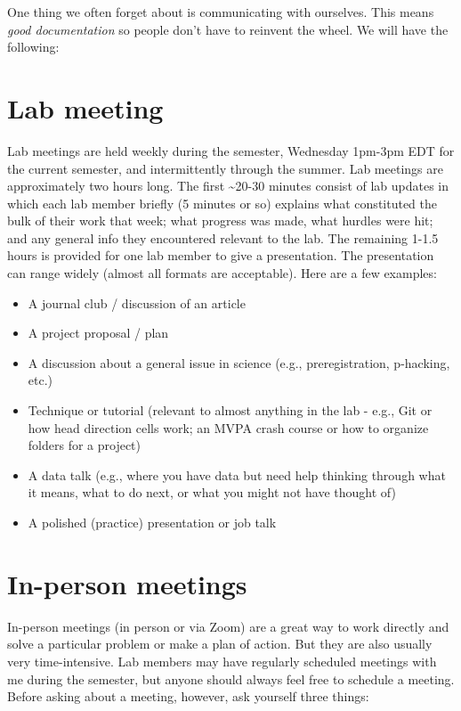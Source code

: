 \documentclass[
  12pt,
]{book}
\begin{document}
One thing we often forget about is communicating with ourselves. This means \emph{good documentation} so people don't have to reinvent the wheel. We will have the following:

\hypertarget{lab-meeting}{%
\section{Lab meeting}\label{lab-meeting}}

Lab meetings are held weekly during the semester, Wednesday 1pm-3pm EDT for the current semester, and intermittently through the summer. Lab meetings are approximately two hours long. The first \textasciitilde20-30 minutes consist of lab updates in which each lab member briefly (5 minutes or so) explains what constituted the bulk of their work that week; what progress was made, what hurdles were hit; and any general info they encountered relevant to the lab. The remaining 1-1.5 hours is provided for one lab member to give a presentation. The presentation can range widely (almost all formats are acceptable). Here are a few examples:

\begin{itemize}
\item
  A journal club / discussion of an article
\item
  A project proposal / plan
\item
  A discussion about a general issue in science (e.g., preregistration, p-hacking, etc.)
\item
  Technique or tutorial (relevant to almost anything in the lab - e.g., Git or how head direction cells work; an MVPA crash course or how to organize folders for a project)
\item
  A data talk (e.g., where you have data but need help thinking through what it means, what to do next, or what you might not have thought of)
\item
  A polished (practice) presentation or job talk
\end{itemize}

\hypertarget{in-person-meetings}{%
\section{In-person meetings}\label{in-person-meetings}}

In-person meetings (in person or via Zoom) are a great way to work directly and solve a particular problem or make a plan of action. But they are also usually very time-intensive. Lab members may have regularly scheduled meetings with me during the semester, but anyone should always feel free to schedule a meeting. Before asking about a meeting, however, ask yourself three things:
\end{document}
